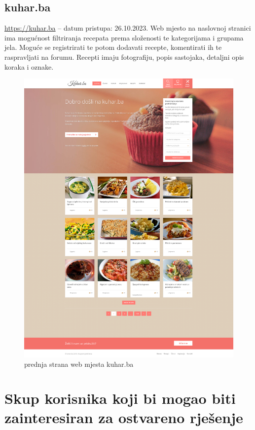 		\subsection{kuhar.ba}
			\url{https://kuhar.ba} -- datum pristupa: 26.10.2023.
			Web mjesto na naslovnoj stranici ima mogućnost filtriranja recepata prema složenosti te kategorijama i grupama jela. Moguće se registrirati te potom dodavati recepte, komentirati ih te raspravljati na forumu. Recepti imaju fotografiju, popis sastojaka, detaljni opis koraka i oznake.
				\begin{figure}[H]
					\centering
					\includegraphics[scale=0.1]{slike/02-01-kuhar-ba.PNG}
					\caption{prednja strana web mjesta kuhar.ba}
					\label{fig:kuhar-ba-front}
				\end{figure} 
	

	\section{Skup korisnika koji bi mogao biti zainteresiran za ostvareno rješenje}
